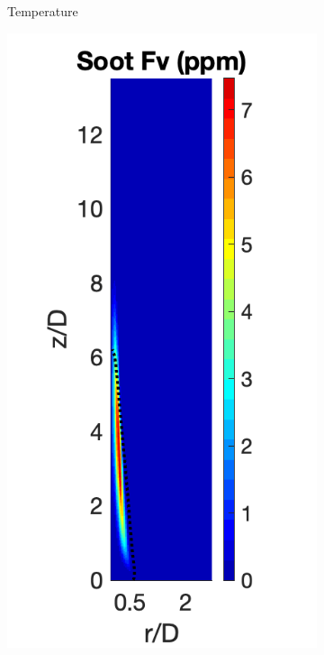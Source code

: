 \documentclass[12pt]{CHT-20}
\begin{document}
\begin{figure}[H]
\begin{subfigure}[b]{0.245\textwidth}
         \caption{Temperature}
     \end{subfigure}
     \hfill
     \begin{subfigure}[b]{0.25\textwidth}
         \centering
         \includegraphics[width=\textwidth]{figures/santoro/fvContour.png}

\end{subfigure}
\end{figure}
\end{document}
